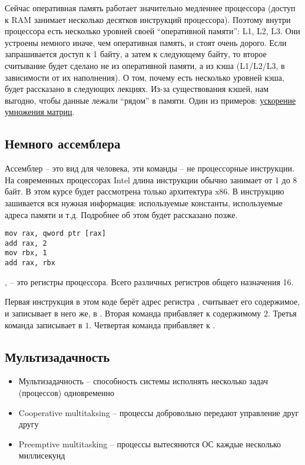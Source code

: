  Сейчас оперативная память работает значительно медленнее процессора (доступ к RAM занимает несколько десятков инструкций процессора). Поэтому внутри процессора есть несколько уровней своей ``оперативной памяти'': L1, L2, L3. Они устроены немного иначе, чем оперативная память, и стоят очень дорого. Если запрашивается доступ к 1 байту, а затем к следующему байту, то второе считывание будет сделано не из оперативной памяти, а из кэша (L1/L2/L3, в зависимости от их наполнения). О том, почему есть несколько уровней кэша, будет рассказано в следующих лекциях.
  Из-за существования кэшей, нам выгодно, чтобы данные лежали ``рядом'' в памяти. Один из примеров: \href{https://levelup.gitconnected.com/c-programming-hacks-4-matrix-multiplication-are-we-doing-it-right-21a9f1cbf53}{ускорение умножения матриц}.
  
  \subsection{Немного ассемблера}
  Ассемблер -- это вид для человека, эти команды -- не процессорные инструкции. На современных процессорах Intel длина инструкции обычно занимает от 1 до 8 байт. В этом курсе будет рассмотрена только архитектура x86. В инструкцию зашивается вся нужная информация: используемые константы, используемые адреса памяти и т.д. Подробнее об этом будет рассказано позже.

\begin{lstlisting}[style=asm]
mov rax, qword ptr [rax]
add rax, 2
mov rbx, 1
add rax, rbx
\end{lstlisting}

,  -- это регистры процессора. Всего различных регистров общего назначения 16. \newline

Первая инструкция в этом коде берёт адрес регистра , считывает его содержимое, и записывает в него же, в . \newline
Вторая команда прибавляет к содержимому  $2$. \newline
Третья команда записывает в  $1$. \newline
Четвертая команда прибавляет  к .
        
    \subsection{Мультизадачность}
    \begin{itemize}
      \item Мультизадачность -- способность системы исполнять несколько задач (процессов) одновременно
      \item Cooperative multitaksing -- процессы добровольно передают управление друг другу
      \item Preemptive multitasking -- процессы вытесянются ОС каждые несколько миллисекунд
    \end{itemize}
    
